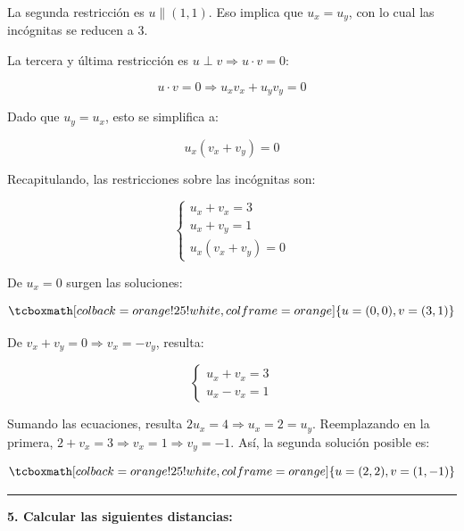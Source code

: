 \documentclass{article}
\begin{document}
La segunda restricción es $u \parallel (1, 1)$. Eso implica que $u_x = u_y$, con lo cual las incógnitas se reducen a 3.

La tercera y última restricción es $u \perp v \Rightarrow u \cdot v = 0$:

\begin{equation}
u \cdot v = 0 \Rightarrow u_x v_x + u_y v_y = 0
\end{equation}

Dado que $u_y = u_x$, esto se simplifica a:

\begin{equation}
u_x (v_x + v_y) = 0
\end{equation}

Recapitulando, las restricciones sobre las incógnitas son:

\begin{equation}
\left\{
\begin{array}{ll}
u_x + v_x = 3 \\
u_x + v_y = 1 \\
u_x (v_x + v_y) = 0
\end{array} \right.
\end{equation}

De $u_x = 0$ surgen las soluciones:

\begin{equation}
\tcboxmath[colback=orange!25!white,colframe=orange]
{ u = (0,0), v = (3, 1) }
\end{equation}

De $v_x + v_y = 0 \Rightarrow v_x = -v_y$, resulta:

\begin{equation}
\left\{ \begin{array}{ll}
u_x + v_x = 3 \\
u_x - v_x = 1
\end{array} \right.
\end{equation}

Sumando las ecuaciones, resulta $2 u_x = 4 \Rightarrow u_x = 2 = u_y$. Reemplazando en la primera, $2 + v_x = 3 \Rightarrow v_x = 1 \Rightarrow v_y = -1$. Así, la segunda solución posible es:

\begin{equation}
\tcboxmath[colback=orange!25!white,colframe=orange]
{ u = (2,2), v = (1, -1) }
\end{equation}

\hrule
\vspace{10 pt}
\textbf{5. Calcular las siguientes distancias:} 
\end{document}
